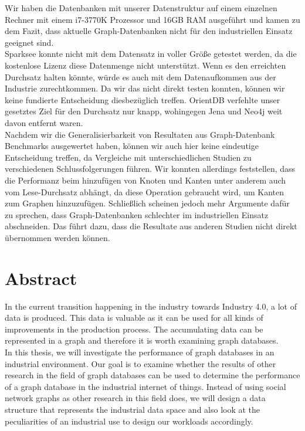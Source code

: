 Wir haben die Datenbanken mit unserer Datenstruktur auf einem einzelnen Rechner mit einem i7-3770K Prozessor und 16GB RAM ausgeführt und kamen zu dem Fazit,
dass aktuelle Graph-Datenbanken nicht für den industriellen Einsatz geeignet sind.\\
Sparksee konnte nicht mit dem Datensatz in voller Größe getestet werden,
da die kostenlose Lizenz diese Datenmenge nicht unterstützt.
Wenn es den erreichten Durchsatz halten könnte,
würde es auch mit dem Datenaufkommen aus der Industrie zurechtkommen.
Da wir das nicht direkt testen konnten,
können wir keine fundierte Entscheidung diesbezüglich treffen.
OrientDB verfehlte unser gesetztes Ziel für den Durchsatz nur knapp,
wohingegen Jena und Neo4j weit davon entfernt waren.\\
Nachdem wir die Generalisierbarkeit von Resultaten aus Graph-Datenbank Benchmarks ausgewertet haben,
können wir auch hier keine eindeutige Entscheidung treffen,
da Vergleiche mit unterschiedlichen Studien zu verschiedenen Schlussfolgerungen führen.
Wir konnten allerdings feststellen,
dass die Performanz beim hinzufügen von Knoten und Kanten unter anderem auch vom Lese-Durchsatz abhängt,
da diese Operation gebraucht wird,
um Kanten zum Graphen hinzuzufügen.
Schließlich scheinen jedoch mehr Argumente dafür zu sprechen,
dass Graph-Datenbanken schlechter im industriellen Einsatz abschneiden.
Das führt dazu,
dass die Resultate aus anderen Studien nicht direkt übernommen werden können.

\cleardoublepage

\chapter*{Abstract}

In the current transition happening in the industry towards Industry 4.0,
a lot of data is produced.
This data is valuable as it can be used for all kinds of improvements in the production process.
The accumulating data can be represented in a graph and therefore it is worth examining graph databases.\\
In this thesis,
we will investigate the performance of graph databases in an industrial environment.
Our goal is to examine whether the results of other research in the field of graph databases can be used to determine the performance of a graph database in the industrial internet of things.
Instead of using social network graphs as other research in this field does,
we will design a data structure that represents the industrial data space and also look at the peculiarities of an industrial use to design our workloads accordingly.

